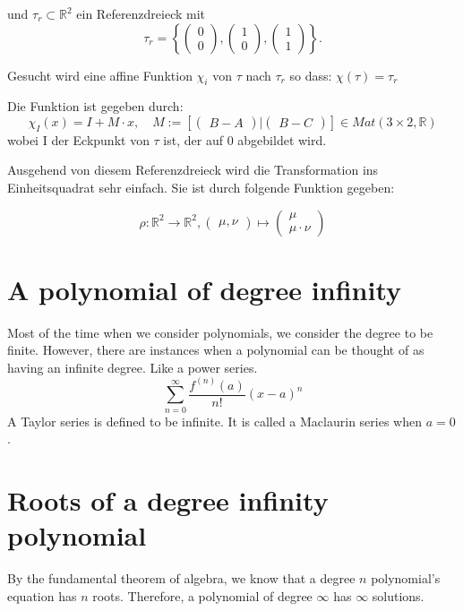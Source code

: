 \documentclass[12pt]{article}
\begin{document}
und $\tau_r \subset \mathbb{R}^2$ ein Referenzdreieck mit
\[
 \tau_r = \left \{
\begin{pmatrix} 0\\ 0 \end{pmatrix}
,
\begin{pmatrix} 1\\ 0\end{pmatrix}
,
\begin{pmatrix} 1\\ 1\end{pmatrix}
\right \} .
\]

Gesucht wird eine affine Funktion $\chi_i$ von $\tau$ nach $\tau_r$ so dass: $\chi(\tau) = \tau_r$

Die Funktion ist gegeben durch:
\[
\chi_I(x) = I + M\cdot x, \quad M := \left[
\begin{pmatrix} B-A \end{pmatrix}
|
\begin{pmatrix} B-C \end{pmatrix}
\right]
 \in Mat(3\times 2,\mathbb{R})
\]
wobei I der Eckpunkt von $\tau$ ist, der auf 0 abgebildet wird.

Ausgehend von diesem Referenzdreieck wird die Transformation ins Einheitsquadrat sehr einfach. Sie ist durch folgende Funktion gegeben:

\[
	\rho : \mathbb{R}^2 \rightarrow \mathbb{R}^2, \begin{pmatrix} \mu,\nu \end{pmatrix} \mapsto \begin{pmatrix} \mu\\\mu\cdot\nu \end{pmatrix}
\]


 

\newpage


\section{A polynomial of degree infinity}

Most of the time when we consider polynomials, we consider the degree to be finite.
However, there are instances when a polynomial can be thought of as having an infinite degree. Like a power series.
\[
    \sum_{n = 0}^{\infty} \frac{f^{(n)} (a)}{n!} (x-a)^n
\]
A Taylor series is defined to be infinite.
It is called a Maclaurin series when $a = 0$.
\label{S:2}
\section{Roots of a degree infinity polynomial}
By the fundamental theorem of algebra, we know that a degree $n$ polynomial's equation has $n$ roots.
Therefore, a polynomial of degree $\infty$ has $\infty$ solutions.
\end{document}
